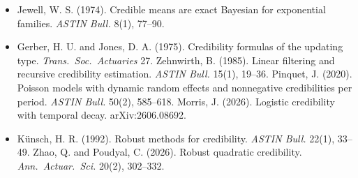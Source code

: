 \documentclass[10pt]{article}
\begin{document}
{\begin{itemize}
  \item Jewell, W. S. (1974). Credible means are exact Bayesian for exponential families.
    \emph{ASTIN Bull.} 8(1), 77--90.
  \item Gerber, H. U. and Jones, D. A. (1975). Credibility formulas of the updating type.
    \emph{Trans.\ Soc.\ Actuaries} 27. Zehnwirth, B. (1985). Linear filtering and recursive
    credibility estimation. \emph{ASTIN Bull.} 15(1), 19--36. Pinquet, J. (2020). Poisson models
    with dynamic random effects and nonnegative credibilities per period. \emph{ASTIN Bull.} 50(2),
    585--618. Morris, J. (2026). Logistic credibility with temporal decay. arXiv:2606.08692.
  \item Künsch, H. R. (1992). Robust methods for credibility. \emph{ASTIN Bull.} 22(1), 33--49.
    Zhao, Q. and Poudyal, C. (2026). Robust quadratic credibility. \emph{Ann.\ Actuar.\ Sci.} 20(2),
    302--332.
\end{itemize}}
\end{document}

